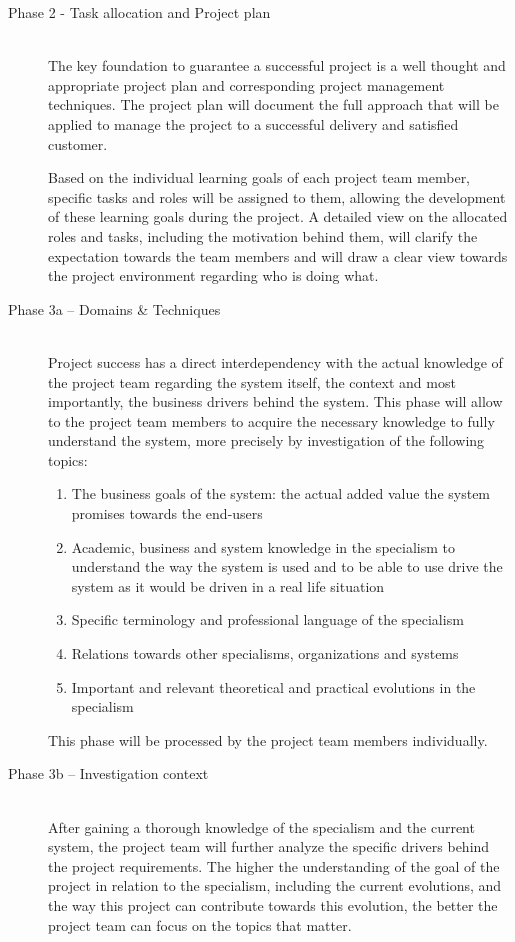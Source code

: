  \begin{description}
	\item [Phase 2 - Task allocation and Project plan]~\\
		The key foundation to guarantee a successful project is a well thought and appropriate project plan and corresponding project management techniques.
		The project plan will document the full approach that will be applied to manage the project to a successful delivery and satisfied customer.
		
		Based on the individual learning goals of each project team member, specific tasks and roles will be assigned to them, allowing the development of these learning goals during the project.
		A detailed view on the allocated roles and tasks, including the motivation behind them, will clarify the expectation towards the team members and will draw a clear view towards the project environment regarding who is doing what.
	\item [Phase 3a -- Domains \& Techniques]~\\
		Project success has a direct interdependency with the actual knowledge of the project team regarding the system itself, the context and most importantly, the business drivers behind the system.
		This phase will allow to the project team members to acquire the necessary knowledge to fully understand  the system, more precisely by investigation of the following topics:

 		\begin{enumerate}
			\item The business goals of the system: the actual added value the system promises towards the end-users
			\item Academic, business and system knowledge in the specialism to understand the way the system is used and to be able to use drive the system as it would be driven in a real life situation
			\item Specific terminology and professional language of the specialism
			\item Relations towards other specialisms, organizations and systems
			\item Important and relevant theoretical and practical evolutions in the specialism
		\end {enumerate}

		This phase will be processed by the project team members individually.
 	\item [Phase 3b -- Investigation context]~\\
		After gaining a thorough knowledge of the specialism and the current system, the project team will further analyze the specific drivers behind the project requirements.
		The higher the understanding of the goal of the project in relation to the specialism, including the current evolutions, and the way this project can contribute towards this evolution, the better the project team can focus on the topics that matter.
	

\end{description}
